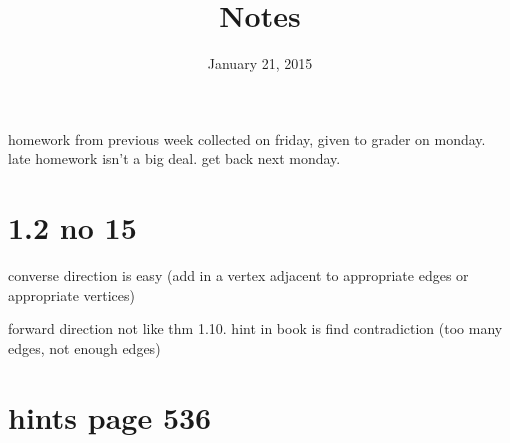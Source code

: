 \documentclass[letterpaper]{article}
\begin{document}
\title{Notes}
\date{January 21, 2015}
\maketitle
homework from previous week collected on friday, given to grader on monday. late homework isn't a big deal. get back next monday. 

\section*{1.2 no 15}
converse direction is easy (add in a vertex adjacent to appropriate edges or appropriate vertices)

forward direction
not like thm 1.10. hint in book is find contradiction (too many edges, not enough edges)

\section*{hints page 536}
\end{document}
